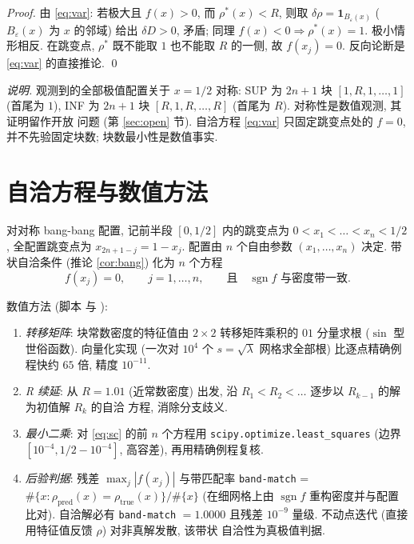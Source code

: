 \documentclass[UTF8]{ctexart}
\begin{document}
\begin{proof}
	由 \eqref{eq:var}: 若极大且 $f(x) > 0$, 而 $\rho^*(x) < R$,
	则取 $\delta\rho = \mathbf{1}_{B_\varepsilon(x)}$ ($B_\varepsilon(x)$ 为
	$x$ 的邻域) 给出 $\delta D > 0$, 矛盾; 同理 $f(x) < 0 \Rightarrow
	\rho^*(x) = 1$. 极小情形相反. 在跳变点, $\rho^*$ 既不能取 $1$ 也不能取
	$R$ 的一侧, 故 $f(x_j) = 0$. 反向论断是 \eqref{eq:var} 的直接推论.
	\qed
\end{proof}

\emph{说明.} 观测到的全部极值配置关于 $x = 1/2$ 对称: SUP 为
$2n+1$ 块 $[1, R, 1, \dots, 1]$ (首尾为 $1$), INF 为 $2n+1$ 块
$[R, 1, R, \dots, R]$ (首尾为 $R$). 对称性是数值观测, 其证明留作开放
问题 (第 \ref{sec:open} 节). 自洽方程 \eqref{eq:var} 只固定跳变点处的
$f = 0$, 并不先验固定块数; 块数最小性是数值事实.

\section{自洽方程与数值方法}\label{sec:method}

对对称 bang-bang 配置, 记前半段 $[0, 1/2]$ 内的跳变点为
$0 < x_1 < \dots < x_n < 1/2$, 全配置跳变点为
$x_{2n+1-j} = 1 - x_j$. 配置由 $n$ 个自由参数 $(x_1, \dots, x_n)$ 决定.
带状自洽条件 (推论 \ref{cor:bang}) 化为 $n$ 个方程
\begin{equation}\label{eq:sc}
	f(x_j) = 0, \qquad j = 1, \dots, n,
	\qquad \text{且}\quad \operatorname{sgn} f
	\text{ 与密度带一致}.
\end{equation}

数值方法 (脚本  与
):
\begin{enumerate}
	\item \emph{转移矩阵}: 块常数密度的特征值由
		$2\times2$ 转移矩阵乘积的 $01$ 分量求根 ($\sin$ 型世俗函数).
		向量化实现 (一次对 $10^4$ 个 $s = \sqrt\lambda$ 网格求全部根)
		比逐点精确例程快约 $65$ 倍, 精度 $10^{-11}$.
	\item \emph{R 续延}: 从 $R = 1.01$ (近常数密度) 出发, 沿
		$R_1 < R_2 < \dots$ 逐步以 $R_{k-1}$ 的解为初值解 $R_k$ 的自洽
		方程, 消除分支歧义.
	\item \emph{最小二乘}: 对 \eqref{eq:sc} 的前 $n$ 个方程用
		\texttt{scipy.optimize.least\_squares} (边界
		$[10^{-4}, 1/2 - 10^{-4}]$, 高容差), 再用精确例程复核.
	\item \emph{后验判据}: 残差 $\max_j |f(x_j)|$ 与带匹配率
		\texttt{band-match} = $\#\{x: \rho_{\mathrm{pred}}(x) =
		\rho_{\mathrm{true}}(x)\}/\#\{x\}$ (在细网格上由
		$\operatorname{sgn} f$ 重构密度并与配置比对). 自洽解必有
		\texttt{band-match} $= 1.0000$ 且残差 $10^{-9}$ 量级.
		不动点迭代 (直接用特征值反馈 $\rho$) 对非真解发散, 该带状
		自洽性为真极值判据.
\end{enumerate}
\end{document}
